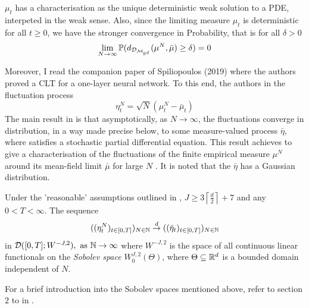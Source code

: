 \documentclass{article}
\begin{document}
\begin{remark}
    $ \mu_{t}$ has a characterisation as the unique deterministic weak solution to a PDE, interpeted in the weak sense. Also, since the limiting measure $ \mu_{t}$ is deterministic for all $ t\geq 0$, we have the stronger convergence in Probability, that is for all $ \delta >0$
    \[
    \displaystyle \lim_{N\to \infty}\mathbb{P}(d_{  \mathcal{D}_{\mathcal{M}_{\mathbb{R}^{d}}} }(\mu^{N}, \bar{\mu})\geq \delta) = 0 
    \]
    
\end{remark}


Moreover, I read the companion paper of Spiliopoulos (2019) \cite{sirignano2019meanfieldanalysisclt} where the authors proved a CLT for a one-layer neural network. To this end, the authors in \cite{sirignano2019meanfieldanalysisclt} the fluctuation process 
\begin{equation}
	\eta^{N}_t = \sqrt{N}(\mu^{N}_{t}-\bar{\mu}_{t})
\end{equation}
The main result in \cite{sirignano2019meanfieldanalysisclt} is that asymptotically, as $ N\to \infty$, the fluctuations converge in distribution, in a way made precise below, to some measure-valued process $ \bar{\eta}$, where satisfies a stochastic partial differential equation. This result achieves to give a characterisation of the fluctuations of the finite empirical measure $ \mu^{N}$ around its mean-field limit $ \bar{\mu}$ for large $ N$ . It is noted that the $ \bar{\eta}$
has a Gaussian distribution.

\begin{theorem}\label{thm: spiliopoulos CLT}
	Under the 'reasonable' assumptions outlined in \cite{sirignano2019meanfieldanalysisclt}, $J \geq 3\left \lceil \frac{d}{2}\right\rceil+7$ and any $ 0<T<\infty$. The sequence
	\begin{equation} 
		((\eta^{N}_{t})_{t\in [0,T]})_{N\in \mathbb{N}}\stackrel{d}{\to} ((\bar{\eta}_{t})_{t\in [0,T]})_{N\in \mathbb{N}}
	\end{equation}
	in $\mathcal{D}([0,T];W^{-J,2}), \text{ as } \mathbb{N}\to \infty$ where $ W^{-J,2}$ is the space of all continuous linear functionals on the \textit{Sobolev space} $ W^{J,2}_{0}(\Theta)$, where $ \Theta\subseteq\mathbb{R}^{d}$ is a bounded domain independent of $ N$.
\end{theorem}

\begin{remark}
	For a brief introduction into the Sobolev spaces mentioned above, refer to section $ 2$ to in \cite{sirignano2019meanfieldanalysisclt}.
\end{remark}
\end{document}
